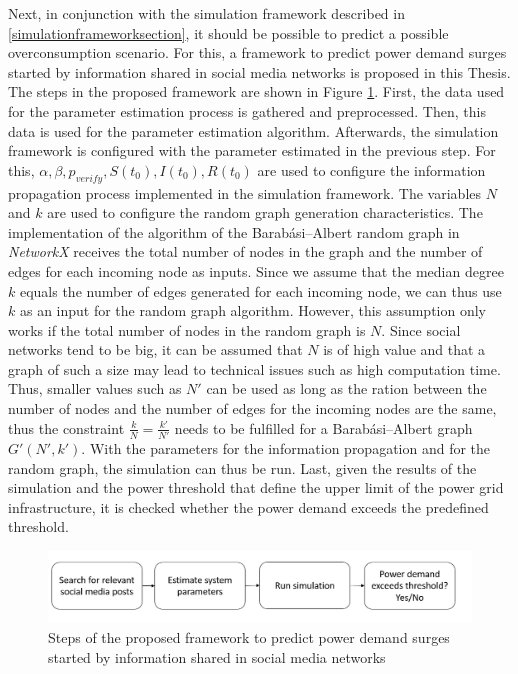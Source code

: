 Next, in conjunction with the simulation framework described in 
\ref{simulationframeworksection}, it should be possible to predict 
a possible overconsumption scenario. For this, a framework
to predict power demand surges started by information shared in 
social media networks is proposed in this Thesis. The steps
in the proposed framework are shown in Figure \ref{basicpredicitonframework}.
First, the data used for the parameter estimation process is gathered and
preprocessed. Then, this data is used for the parameter estimation algorithm. 
Afterwards, the simulation framework is configured
with the parameter estimated in the previous step. For this, 
$\alpha, \beta, p_{verify}, S(t_0), I(t_0), R(t_0)$ are used to configure the 
information propagation process implemented in the simulation framework.
The variables $N$ and $k$ are used to configure the random graph generation
characteristics. The implementation of the 
algorithm of the Barabási–Albert random graph in \textit{NetworkX}
receives the total number of nodes in the graph and the number of edges 
for each incoming node as inputs. Since we assume that the median degree
$k$ equals the number of edges generated for each incoming node, we can thus
use $k$ as an input for the random graph algorithm. However, this assumption
only works if the total number of nodes in the random graph is $N$.
Since social networks tend to be big, it can be assumed that 
$N$ is of high value and that a graph of such a size may lead to technical 
issues such as high computation time. Thus, smaller values such as $N'$
can be used as long as the ration between the number of nodes and the
number of edges for the incoming nodes are the same, thus the constraint
$\frac{k}{N}=\frac{k'}{N'}$ needs to be fulfilled for a Barabási–Albert
graph $G'(N',k')$. With the parameters for the information propagation and 
for the random graph, the simulation can thus be run. 
Last, given the results of the simulation and the power threshold
that define the upper limit of the power grid infrastructure, it
is checked whether the power demand exceeds the predefined threshold.


\begin{figure}[!ht]
    \center
    \includegraphics[scale=.65]{figs/full_prediction_framework.png}
    \caption{Steps of the proposed framework to predict power demand surges
    started by information shared in social media networks}
    \label{basicpredicitonframework}
\end{figure}


